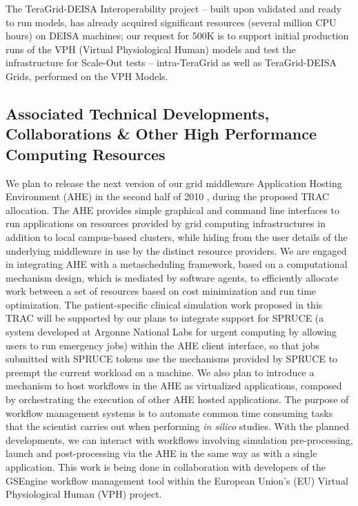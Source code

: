 \documentclass[a4paper,10pt]{article}
\begin{document}
The TeraGrid-DEISA Interoperability project -- built upon validated and ready to run models, has already acquired significant resources (several million CPU hours) on DEISA machines; our request for 500K is to support initial production runs of the VPH (Virtual Physiological Human) models and test the infrastructure for Scale-Out tests -- intra-TeraGrid as well as TeraGrid-DEISA Grids, performed on the VPH Models.

\subsection{Associated Technical Developments, Collaborations \& Other High
Performance Computing Resources}

We plan to release the next version of our grid middleware Application Hosting Environment (AHE) in the second half of 2010 \cite{zasada2009,coveney2007}, during the proposed TRAC allocation.  The AHE provides simple graphical and command line interfaces to run applications on resources provided by grid computing infrastructures in addition to local campus-based clusters, while hiding from the user details of the underlying middleware in use by the distinct resource providers.  We are engaged in integrating AHE with a metascheduling framework, based on a computational mechanism design, which is mediated by software agents, to efficiently allocate work between a set of resources based on cost minimization and run time optimization.  The patient-specific clinical simulation work proposed in this TRAC will be supported by our plans to integrate support for SPRUCE (a system developed at Argonne National Labs for urgent computing by allowing users to run emergency jobs) within the AHE client interface, so that jobs submitted with SPRUCE tokens use the mechanisms provided by SPRUCE to preempt the current workload on a machine. We also plan to introduce a mechanism to host workflows in the AHE as virtualized applications, composed by orchestrating the execution of other AHE hosted applications. The purpose of workflow management systems is to automate common time consuming tasks that the scientist carries out when performing \emph{in silico} studies. With the planned developments, we can interact with workflows involving simulation pre-processing, launch and post-processing via the AHE in the same way as with a single application. This work is being done in collaboration with developers of the GSEngine workflow management tool within the European Union's (EU) Virtual Physiological Human (VPH) project.
\end{document}
